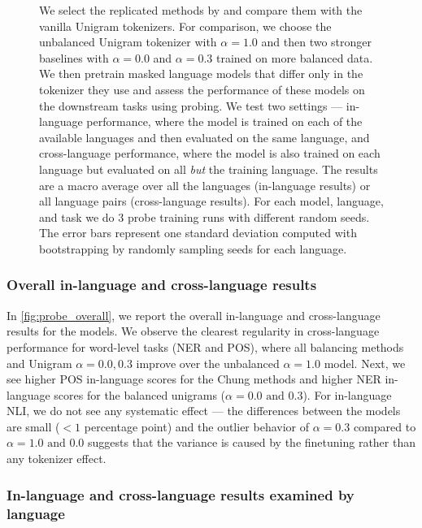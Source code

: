 \begin{figure}
    \caption{We select the replicated methods by \citet{chung_improving_2020,zheng_allocating_2021} and compare them with the vanilla Unigram tokenizers. For comparison, we choose the unbalanced Unigram tokenizer with $\alpha=1.0$ and then two stronger baselines with $\alpha=0.0$ and $\alpha=0.3$ trained on more balanced data. We then pretrain masked language models that differ only in the tokenizer they use and assess the performance of these models on the downstream tasks using probing. We test two settings --- in-language performance, where the model is trained on each of the available languages and then evaluated on the same language, and cross-language performance, where the model is also trained on each language but evaluated on all \textit{but} the training language. The results are a macro average over all the languages (in-language results) or all language pairs (cross-language results). For each model, language, and task we do 3 probe training runs with different random seeds. The error bars represent one standard deviation computed with bootstrapping by randomly sampling seeds for each language.}
    \label{fig:probe_overall}
\end{figure}

\subsubsection{Overall in-language and cross-language results}

In \autoref{fig:probe_overall}, we report the overall in-language and cross-language results for the models. We observe the clearest regularity in cross-language performance for word-level tasks (NER and POS), where all balancing methods and Unigram $\alpha=0.0,0.3$ improve over the unbalanced $\alpha=1.0$ model. Next, we see higher POS in-language scores for the Chung methods and higher NER in-language scores for the balanced unigrams ($\alpha=0.0\text{ and }0.3$). For in-language NLI, we do not see any systematic effect --- the differences between the models are small ($<1$ percentage point) and the outlier behavior of $\alpha=0.3$ compared to $\alpha=1.0\text{ and }0.0$ suggests that the variance is caused by the finetuning rather than any tokenizer effect.

\subsubsection{In-language and cross-language results examined by language}

